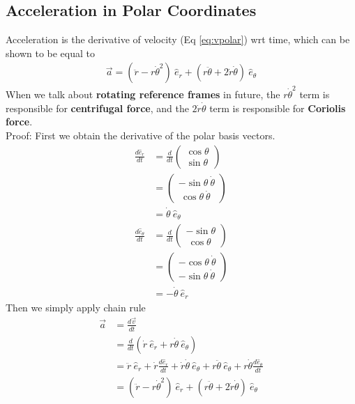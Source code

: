 \documentclass{article}
\begin{document}
\subsection{Acceleration in Polar Coordinates}
Acceleration is the derivative of velocity (Eq \ref{eq:vpolar}) wrt time, which can be shown to be equal to 
\begin{align}
    \vec{a} = (\ddot{r} - r{\dot\theta}^2)\ \hat{e}_r + (r\ddot\theta + 2\dot r \dot \theta)\ \hat{e}_\theta
\end{align}
When we talk about \textbf{rotating reference frames} in future, the $r{\dot\theta}^2$ term is responsible for \textbf{centrifugal force}, and the $2\dot r \dot \theta$ term is responsible for \textbf{Coriolis force}. \\[10pt]
Proof: First we obtain the derivative of the polar basis vectors.
\begin{align}
    \frac{d\hat{e}_r}{dt} &= \frac{d}{dt}\left(\begin{array}{l}
         \cos\theta \\
         \sin\theta
    \end{array}\right) \\ 
    &= \left(\begin{array}{l}
         -\sin\theta \ \dot\theta  \\
         \ \cos\theta \ \dot\theta 
    \end{array}\right)\\
    &= \dot\theta\ \hat{e}_\theta \\
    \frac{d\hat{e}_\theta}{dt} &= \frac{d}{dt}\left(\begin{array}{l}
         -\sin\theta \\
         \ \cos\theta
    \end{array}\right) \\ 
    &= \left(\begin{array}{l}
         -\cos\theta \ \dot\theta  \\
         - \sin\theta \ \dot\theta 
    \end{array}\right)\\
    &= -\dot\theta\ \hat{e}_r 
    \end{align}
Then we simply apply chain rule
    \begin{align}
    \vec{a} &= \frac{d\vec{v}}{dt} \\
    &= \frac{d}{dt} (\dot{r}\ \hat{e}_r + r \dot{\theta}\ \hat{e}_\theta )\\
    &= \ddot{r}\ \hat{e}_r + \dot{r} \frac{d\hat{e}_r}{dt} + \dot r\dot\theta \ \hat{e}_\theta + r \ddot \theta \ \hat{e}_\theta + r\dot\theta \frac{d\hat{e}_\theta}{dt} \\
    &= (\ddot{r} - r{\dot\theta}^2)\ \hat{e}_r + (r\ddot\theta + 2\dot r \dot \theta)\ \hat{e}_\theta
\end{align}
\end{document}

